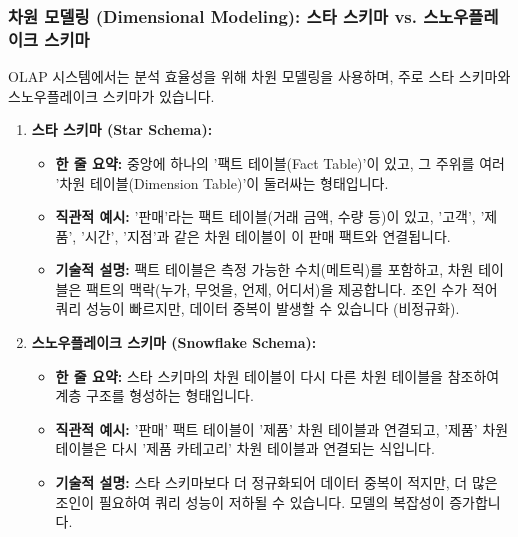 \documentclass[11pt,a4paper]{article}
\theoremstyle{definition}
\begin{document}
\subsubsection{차원 모델링 (Dimensional Modeling): 스타 스키마 vs. 스노우플레이크 스키마}
OLAP 시스템에서는 분석 효율성을 위해 차원 모델링을 사용하며, 주로 스타 스키마와 스노우플레이크 스키마가 있습니다.

\begin{enumerate}
    \item \textbf{스타 스키마 (Star Schema):}
    \begin{itemize}
        \item \textbf{한 줄 요약:} 중앙에 하나의 '팩트 테이블(Fact Table)'이 있고, 그 주위를 여러 '차원 테이블(Dimension Table)'이 둘러싸는 형태입니다.
        \item \textbf{직관적 예시:} '판매'라는 팩트 테이블(거래 금액, 수량 등)이 있고, '고객', '제품', '시간', '지점'과 같은 차원 테이블이 이 판매 팩트와 연결됩니다.
        \item \textbf{기술적 설명:} 팩트 테이블은 측정 가능한 수치(메트릭)를 포함하고, 차원 테이블은 팩트의 맥락(누가, 무엇을, 언제, 어디서)을 제공합니다. 조인 수가 적어 쿼리 성능이 빠르지만, 데이터 중복이 발생할 수 있습니다 (비정규화).
    \end{itemize}

    \item \textbf{스노우플레이크 스키마 (Snowflake Schema):}
    \begin{itemize}
        \item \textbf{한 줄 요약:} 스타 스키마의 차원 테이블이 다시 다른 차원 테이블을 참조하여 계층 구조를 형성하는 형태입니다.
        \item \textbf{직관적 예시:} '판매' 팩트 테이블이 '제품' 차원 테이블과 연결되고, '제품' 차원 테이블은 다시 '제품 카테고리' 차원 테이블과 연결되는 식입니다.
        \item \textbf{기술적 설명:} 스타 스키마보다 더 정규화되어 데이터 중복이 적지만, 더 많은 조인이 필요하여 쿼리 성능이 저하될 수 있습니다. 모델의 복잡성이 증가합니다.
    \end{itemize}
\end{enumerate}
\end{document}
